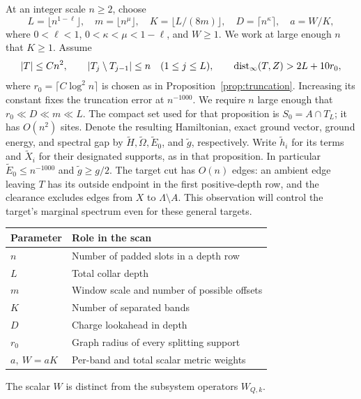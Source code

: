 At an integer scale \(n\ge2\), choose
\begin{equation}
 L=\lfloor n^{1-\ell}\rfloor,
 \quad m=\lfloor n^\mu\rfloor,
 \quad K=\lfloor L/(8m)\rfloor,
 \quad D=\lceil n^\kappa\rceil,
 \quad a=W/K,
 \label{scanner:scales}
\end{equation}
where \(0<\ell<1\), \(0<\kappa<\mu<1-\ell\), and \(W\ge1\).  We work at large
enough \(n\) that \(K\ge1\).  Assume
\begin{equation}
 |T|\le Cn^2,\qquad
 |T_j\setminus T_{j-1}|\le n\quad(1\le j\le L),\qquad
 \operatorname{dist}_\infty(T,Z)>2L+10r_0,
 \label{scanner:test-geometry}
\end{equation}
where \(r_0=\lceil C\log^2 n\rceil\) is chosen as in
Proposition~\ref{prop:truncation}.  Increasing its constant fixes the
truncation error at \(n^{-1000}\).  We require \(n\) large enough that
\(r_0\ll D\ll m\ll L\).  The compact set used for that proposition
is \(S_0=A\cap T_L\); it has \(O(n^2)\) sites.  Denote the resulting
Hamiltonian, exact ground vector, ground energy, and spectral gap by
\(\widetilde H,\widetilde\Omega,\widetilde E_0\), and
\(\widetilde g\), respectively.  Write \(\widetilde h_i\) for its
terms and \(\widetilde X_i\) for their designated supports, as in
that proposition.  In particular
\(\widetilde E_0\le n^{-1000}\) and \(\widetilde g\ge g/2\).
The target cut has \(O(n)\) edges: an ambient edge leaving \(T\)
has its outside endpoint in the first positive-depth row, and the
clearance excludes edges from \(X\) to \(\Lambda\setminus A\).
This observation will control the target's marginal spectrum even for
these general targets.

\begin{center}
\begin{tabular}{@{}ll@{}}
\toprule
Parameter & Role in the scan\\
\midrule
$n$ & Number of padded slots in a depth row\\
$L$ & Total collar depth\\
$m$ & Window scale and number of possible offsets\\
$K$ & Number of separated bands\\
$D$ & Charge lookahead in depth\\
$r_0$ & Graph radius of every splitting support\\
$a,\ W=aK$ & Per-band and total scalar metric weights\\
\bottomrule
\end{tabular}
\end{center}
The scalar $W$ is distinct from the subsystem operators $W_{Q,k}$.

